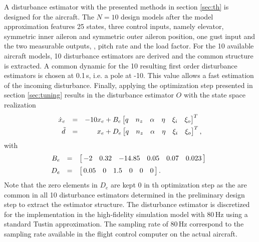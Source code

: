 \documentclass[graybox]{svmult}
\begin{document}
A disturbance estimator with the presented methods in section \ref{sec:th} is designed for the aircraft. The  $N=10$ design models after the model approximation features 25 states, three control inputs, namely elevator, symmetric inner aileron and symmetric outer aileron position, one gust input and the two measurable outputs, \ie,  pitch rate and the load factor. For the  10 available aircraft models, 10 disturbance estimators are derived and the common structure is extracted.
A common dynamic for the 10 resulting first order disturbance estimators is chosen at 0.1\,s, i.e. a pole at -10. This value allows a fast estimation of the incoming disturbance.
Finally, applying the optimization step presented in section \ref{sec:tuning}  results in the disturbance estimator $O$ with the state space realization
\begin{equation}\label{eq:obs}
	\begin{array}{rcr}
		\dot  x_e  &=& -10 x_e + B_e
		\begin{bmatrix}
			q & n_z & \alpha & \eta & \xi_i & \xi _o 
		\end{bmatrix}^T \,\,\, \vspace{+1mm} \\ 
		\tilde d &=&  x_e + 
		D_e
		\begin{bmatrix}
			q & n_z & \alpha & \eta & \xi_i & \xi _o 
		\end{bmatrix}^T,
	\end{array}
\end{equation}
with  
\begin{equation*}
\begin{array}{rcl}
B_e &=&
\begin{bmatrix}
  \, -2 &   0.32 &   -14.85 &   0.05 &   0.07 &  0.023 \,
\end{bmatrix}  \,\,\, \vspace{+2mm} \\
 D_e &=&
\begin{bmatrix}
  \, 0.05  &  0   &1.5 &0 &  0 &  0 \,
\end{bmatrix}. 
\end{array}
\end{equation*}
Note that the zero elements in $D_e$ are kept 0 in th optimization step as the are common in all 10 disturbance estimators determined in the preliminary design step to extract the estimator structure.
The disturbance estimator is discretized for the implementation in the high-fidelity simulation model with 80\,Hz using a standard Tustin approximation.
The sampling rate of 80\,Hz correspond to the sampling rate available in the flight control computer on the actual aircraft.
\end{document}
